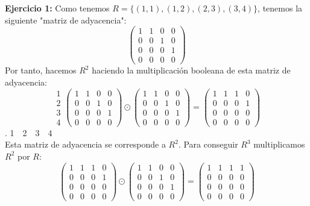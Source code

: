 \documentclass[12pt]{article}
\author{David }
\begin{document}
\textbf{Ejercicio 1: }Como tenemos $R=\{(1,1),(1,2),(2,3),(3,4)\}$, tenemos la siguiente "matriz de adyacencia":\\
\begin{equation*}
    \begin{pmatrix}
    1 & 1 & 0 & 0 \\ 0 & 0 & 1 & 0 \\ 0 & 0 & 0 & 1 \\ 0 & 0 & 0 & 0 
    \end{pmatrix}
\end{equation*}
Por tanto, hacemos $R^2$ haciendo la multiplicación booleana de esta matriz de adyacencia:\\ 


\begin{equation*}
    \begin{matrix}
        1 \\ 2 \\ 3 \\ 4
    \end{matrix} 
    \begin{pmatrix}
    1 & 1 & 0 & 0 \\ 0 & 0 & 1 & 0 \\ 0 & 0 & 0 & 1 \\ 0 & 0 & 0 & 0 
    \end{pmatrix} \odot
    \begin{pmatrix}
    1 & 1 & 0 & 0 \\ 0 & 0 & 1 & 0 \\ 0 & 0 & 0 & 1 \\ 0 & 0 & 0 & 0 
    \end{pmatrix}=
    \begin{pmatrix}
    1 & 1 & 1 & 0 \\ 0 & 0 & 0 & 1 \\ 0 & 0 & 0 & 0 \\ 0 & 0 & 0 & 0 
    \end{pmatrix}
\end{equation*}
. \hspace{137px}1\ \ 2\ \ 3\ \ 4 \\ 
Esta matriz de adyacencia se corresponde a $R^2$. Para conseguir $R^3$ multiplicamos $R^2$ por $R$:
\begin{equation*}
    \begin{pmatrix}
    1 & 1 & 1 & 0 \\ 0 & 0 & 0 & 1 \\ 0 & 0 & 0 & 0 \\ 0 & 0 & 0 & 0 
    \end{pmatrix} \odot
    \begin{pmatrix}
    1 & 1 & 0 & 0 \\ 0 & 0 & 1 & 0 \\ 0 & 0 & 0 & 1 \\ 0 & 0 & 0 & 0 
    \end{pmatrix}=
    \begin{pmatrix}
    1 & 1 & 1 & 1 \\ 0 & 0 & 0 & 0 \\ 0 & 0 & 0 & 0 \\ 0 & 0 & 0 & 0 
    \end{pmatrix}
\end{equation*}
\end{document}
